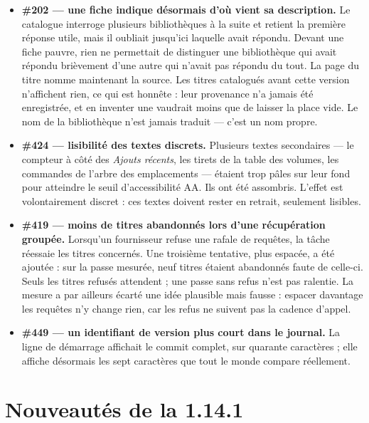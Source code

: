 \begin{itemize}
  \item \textbf{\#202 \string— une fiche indique désormais d'où vient
        sa description.} Le catalogue interroge plusieurs bibliothèques
        à la suite et retient la première réponse utile, mais il
        oubliait jusqu'ici laquelle avait répondu. Devant une fiche
        pauvre, rien ne permettait de distinguer une bibliothèque qui
        avait répondu brièvement d'une autre qui n'avait pas répondu du
        tout. La page du titre nomme maintenant la source. Les titres
        catalogués avant cette version n'affichent rien, ce qui est
        honnête : leur provenance n'a jamais été enregistrée, et en
        inventer une vaudrait moins que de laisser la place vide. Le
        nom de la bibliothèque n'est jamais traduit \string— c'est un
        nom propre.
  \item \textbf{\#424 \string— lisibilité des textes discrets.}
        Plusieurs textes secondaires \string— le compteur à côté des
        \emph{Ajouts récents}, les tirets de la table des volumes, les
        commandes de l'arbre des emplacements \string— étaient trop
        pâles sur leur fond pour atteindre le seuil d'accessibilité AA.
        Ils ont été assombris. L'effet est volontairement discret : ces
        textes doivent rester en retrait, seulement lisibles.
  \item \textbf{\#419 \string— moins de titres abandonnés lors d'une
        récupération groupée.} Lorsqu'un fournisseur refuse une rafale
        de requêtes, la tâche réessaie les titres concernés. Une
        troisième tentative, plus espacée, a été ajoutée : sur la passe
        mesurée, neuf titres étaient abandonnés faute de celle-ci.
        Seuls les titres refusés attendent ; une passe sans refus n'est
        pas ralentie. La mesure a par ailleurs écarté une idée
        plausible mais fausse : espacer davantage les requêtes n'y
        change rien, car les refus ne suivent pas la cadence d'appel.
  \item \textbf{\#449 \string— un identifiant de version plus court
        dans le journal.} La ligne de démarrage affichait le commit
        complet, sur quarante caractères ; elle affiche désormais les
        sept caractères que tout le monde compare réellement.
\end{itemize}

\section{Nouveautés de la 1.14.1}\label{sec:whats-new-1.14.1}


